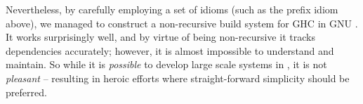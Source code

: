 Nevertheless, by carefully employing a set of idioms (such as the
prefix idiom above), we managed to construct a non-recursive build
system for GHC in GNU \make{}.  It works surprisingly well, and by
virtue of being non-recursive it tracks dependencies accurately;
however, it is almost impossible to understand and maintain.  So while
it is \textit{possible} to develop large scale systems in \make, it is
not \textit{pleasant} -- resulting in heroic efforts where
straight-forward simplicity should be preferred.


